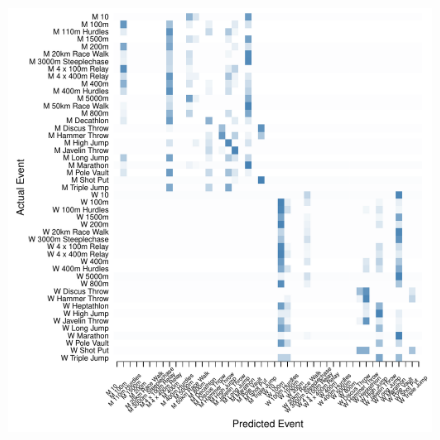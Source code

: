 \begin{figure}
\begin{center}
\begin{minipage}{0.20\textwidth}
\begin{center}
    \end{center}
  \end{minipage}
  \hspace{0.05\textwidth}
  \begin{minipage}{0.20\textwidth}
    \begin{center}
      \includegraphics[scale=0.20]{../graphics/athletesEV-tst.pdf}
    \end{center}
  \end{minipage}



\end{center}
\end{figure}
